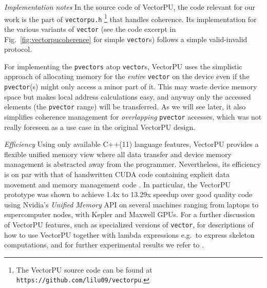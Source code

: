 \vspace{1.4mm}
\noindent
\textit{Implementation notes }
In the source code of VectorPU, the code
relevant for our work is the part of \verb+vectorpu.h+%
\footnote{The VectorPU source code can be found at
\texttt{https://github.com/lilu09/vectorpu}.} 
that handles coherence. Its implementation for the various
variants of \texttt{vector} 
(see the code excerpt in Fig.~\ref{fig:vectorpucoherence} for
simple \texttt{vector}s) follows a
simple valid-invalid protocol.

For implementing the \texttt{pvectors} atop \texttt{vector}s, 
VectorPU uses the simplistic approach of allocating memory for
the \emph{entire} \texttt{vector} on the device 
even if the \texttt{pvector}(s) might only
access a minor part of it. This may waste device memory space 
but makes local address calculations easy, and anyway only
the accessed elements (the \texttt{pvector} range) will be transferred.
As we will see later, it also simplifies coherence management
for \emph{overlapping} \texttt{pvector} accesses, which was not 
really foreseen as a use case in the original VectorPU design.

\vspace{1.4mm}
\noindent
\textit{Efficiency }
Using only available C++(11) language features, 
VectorPU provides a flexible unified memory
view where all data transfer and device memory management
is abstracted away from the programmer. Nevertheless,
its efficiency is on par with that of handwritten CUDA code
containing explicit data movement and memory management code
\cite{VectorPU-2017}.
In particular, the VectorPU prototype was shown to
achieve 1.4x to 13.29x speedup over good quality
code using Nvidia's \textit{Unified Memory} API
on several machines ranging from laptops to supercomputer nodes,
with Kepler and Maxwell GPUs. For a further discussion of
VectorPU features, such as
specialized versions of \verb-vector-, for descriptions
of how to use VectorPU together with lambda expressions 
e.g.\ to express skeleton computations, and for further
experimental results 
we refer to \cite{VectorPU-2017}.
